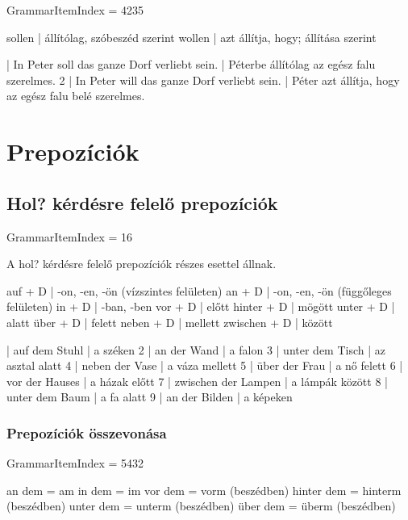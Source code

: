 \documentclass{article}
\newenvironment{desc}{\verbatim}{\endverbatim}
\newenvironment{exmp}{\verbatim}{\endverbatim}
\begin{document}
GrammarItemIndex = 4235

\begin{desc}

sollen | állítólag, szóbeszéd szerint
wollen | azt állítja, hogy; állítása szerint

\end{desc}

\begin{exmp}
1 | In Peter soll das ganze Dorf verliebt sein. | Péterbe állítólag az egész falu szerelmes.
2 | In Peter will das ganze Dorf verliebt sein. | Péter azt állítja, hogy az egész falu belé szerelmes.
\end{exmp}

\section{Prepozíciók}

\subsection{Hol? kérdésre felelő prepozíciók}

GrammarItemIndex = 16

\begin{desc}
A hol? kérdésre felelő prepozíciók részes esettel állnak.


auf + D | -on, -en, -ön (vízszintes felületen)
an + D | -on, -en, -ön (függőleges felületen)
in + D | -ban, -ben
vor + D | előtt
hinter + D | mögött
unter + D | alatt
über + D | felett
neben + D | mellett
zwischen + D | között

\end{desc}

\begin{exmp}
1 | auf dem Stuhl | a széken
2 | an der Wand | a falon
3 | unter dem Tisch | az asztal alatt
4 | neben der Vase | a váza mellett
5 | über der Frau | a nő felett
6 | vor der Hauses | a házak előtt
7 | zwischen der Lampen | a lámpák között
8 | unter dem Baum | a fa alatt
9 | an der Bilden | a képeken
\end{exmp}

\subsubsection{Prepozíciók összevonása}

GrammarItemIndex = 5432

\begin{desc}
an dem = am
in dem = im
vor dem = vorm (beszédben)
hinter dem = hinterm (beszédben)
unter dem = unterm (beszédben)
über dem = überm (beszédben)
\end{desc}
\end{document}

